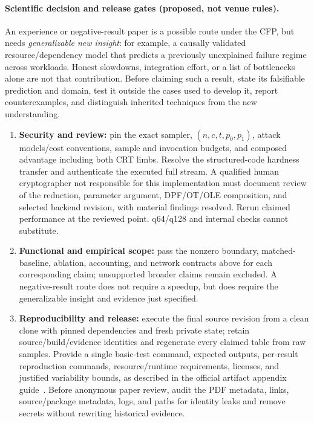 \documentclass[11pt]{article}
\begin{document}
\paragraph{Scientific decision and release gates (proposed, not venue rules).}
An experience or negative-result paper is a possible route under the CFP, but
needs \emph{generalizable new insight}: for example, a causally validated
resource/dependency model that predicts a previously unexplained failure regime
across workloads. Honest slowdowns, integration effort, or a list of bottlenecks
alone are not that contribution. Before claiming such a result, state its
falsifiable prediction and domain, test it outside the cases used to develop
it, report counterexamples, and distinguish inherited techniques from the
new understanding.
\begin{enumerate}
\item \textbf{Security and review:} pin the exact sampler, $(n,c,t,p_0,p_1)$,
  attack models/cost conventions, sample and invocation budgets, and composed
  advantage including both CRT limbs. Resolve the structured-code hardness
  transfer and authenticate the executed full stream. A qualified human
  cryptographer not responsible for this implementation must document review
  of the reduction, parameter argument, DPF/OT/OLE composition, and selected
  backend revision, with material findings resolved. Rerun claimed performance
  at the reviewed point. q64/q128 and internal checks cannot substitute.
\item \textbf{Functional and empirical scope:} pass the nonzero boundary,
  matched-baseline, ablation, accounting, and network contracts above for each
  corresponding claim; unsupported broader claims remain excluded. A
  negative-result route does not require a speedup, but does require the
  generalizable insight and evidence just specified.
\item \textbf{Reproducibility and release:} execute the final source revision
  from a clean clone with pinned dependencies and fresh private state; retain
  source/build/evidence identities and regenerate every claimed table from
  raw samples. Provide a single basic-test command, expected outputs,
  per-result reproduction commands, resource/runtime requirements, licenses,
  and justified variability bounds, as described in the official artifact
  appendix guide~\cite{asplos2027appendix}. Before anonymous paper review,
  audit the PDF metadata, links, source/package metadata, logs, and paths for
  identity leaks and remove secrets without rewriting historical evidence.

\end{enumerate}
\end{document}
